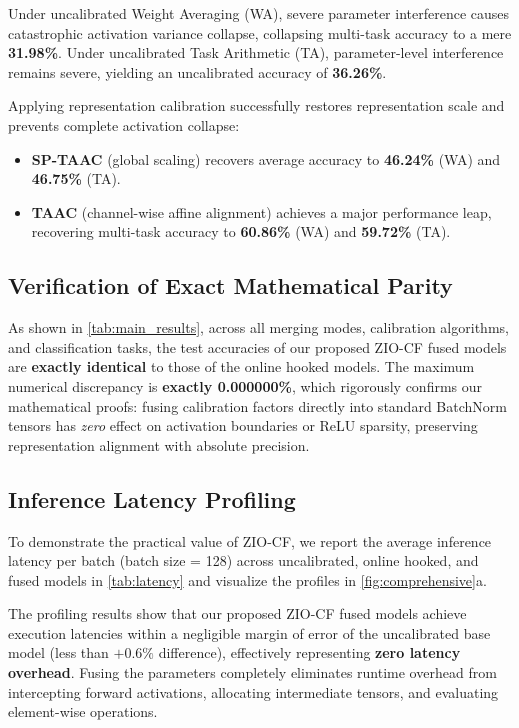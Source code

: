 \documentclass{article}
\begin{document}
Under uncalibrated Weight Averaging (WA), severe parameter interference causes catastrophic activation variance collapse, collapsing multi-task accuracy to a mere \textbf{31.98\%}. Under uncalibrated Task Arithmetic (TA), parameter-level interference remains severe, yielding an uncalibrated accuracy of \textbf{36.26\%}.

Applying representation calibration successfully restores representation scale and prevents complete activation collapse:
\begin{itemize}
    \item \textbf{SP-TAAC} (global scaling) recovers average accuracy to \textbf{46.24\%} (WA) and \textbf{46.75\%} (TA).
    \item \textbf{TAAC} (channel-wise affine alignment) achieves a major performance leap, recovering multi-task accuracy to \textbf{60.86\%} (WA) and \textbf{59.72\%} (TA).
\end{itemize}

\subsection{Verification of Exact Mathematical Parity}
As shown in \cref{tab:main_results}, across all merging modes, calibration algorithms, and classification tasks, the test accuracies of our proposed ZIO-CF fused models are \textbf{exactly identical} to those of the online hooked models. The maximum numerical discrepancy is \textbf{exactly 0.000000\%}, which rigorously confirms our mathematical proofs: fusing calibration factors directly into standard BatchNorm tensors has \textit{zero} effect on activation boundaries or ReLU sparsity, preserving representation alignment with absolute precision.

\subsection{Inference Latency Profiling}
To demonstrate the practical value of ZIO-CF, we report the average inference latency per batch (batch size = 128) across uncalibrated, online hooked, and fused models in \cref{tab:latency} and visualize the profiles in \cref{fig:comprehensive}a.

The profiling results show that our proposed ZIO-CF fused models achieve execution latencies within a negligible margin of error of the uncalibrated base model (less than $+0.6\%$ difference), effectively representing \textbf{zero latency overhead}. Fusing the parameters completely eliminates runtime overhead from intercepting forward activations, allocating intermediate tensors, and evaluating element-wise operations.
\end{document}
